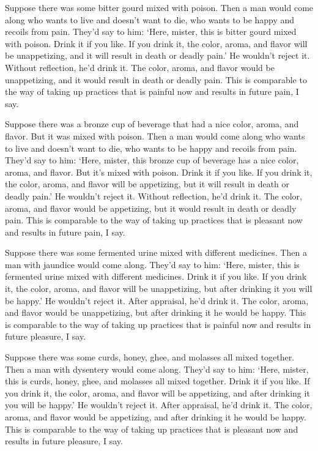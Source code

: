 \documentclass[12pt,openany]{book}%
\begin{document}
Suppose there was some bitter gourd mixed with poison. Then a man would come along who wants to live and doesn’t want to die, who wants to be happy and recoils from pain. They’d say to him: ‘Here, mister, this is bitter gourd mixed with poison. Drink it if you like. If you drink it, the color, aroma, and flavor will be unappetizing, and it will result in death or deadly pain.’ He wouldn’t reject it. Without reflection, he’d drink it. The color, aroma, and flavor would be unappetizing, and it would result in death or deadly pain. This is comparable to the way of taking up practices that is painful now and results in future pain, I say. 

Suppose there was a bronze cup of beverage that had a nice color, aroma, and flavor. But it was mixed with poison. Then a man would come along who wants to live and doesn’t want to die, who wants to be happy and recoils from pain. They’d say to him: ‘Here, mister, this bronze cup of beverage has a nice color, aroma, and flavor. But it’s mixed with poison. Drink it if you like. If you drink it, the color, aroma, and flavor will be appetizing, but it will result in death or deadly pain.’ He wouldn’t reject it. Without reflection, he’d drink it. The color, aroma, and flavor would be appetizing, but it would result in death or deadly pain. This is comparable to the way of taking up practices that is pleasant now and results in future pain, I say. 

Suppose there was some fermented urine mixed with different medicines. Then a man with jaundice would come along. They’d say to him: ‘Here, mister, this is fermented urine mixed with different medicines. Drink it if you like. If you drink it, the color, aroma, and flavor will be unappetizing, but after drinking it you will be happy.’ He wouldn’t reject it. After appraisal, he’d drink it. The color, aroma, and flavor would be unappetizing, but after drinking it he would be happy. This is comparable to the way of taking up practices that is painful now and results in future pleasure, I say. 

Suppose there was some curds, honey, ghee, and molasses all mixed together. Then a man with dysentery would come along. They’d say to him: ‘Here, mister, this is curds, honey, ghee, and molasses all mixed together. Drink it if you like. If you drink it, the color, aroma, and flavor will be appetizing, and after drinking it you will be happy.’ He wouldn’t reject it. After appraisal, he’d drink it. The color, aroma, and flavor would be appetizing, and after drinking it he would be happy. This is comparable to the way of taking up practices that is pleasant now and results in future pleasure, I say. 
\end{document}
